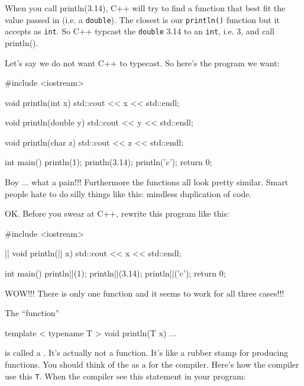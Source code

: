 When you call println(3.14), C++ will try to find a function that best
fit the value passed in (i.e. a \texttt{double}). The closest is our
\texttt{println()} function but it accepts as \texttt{int}. So C++ typcast
the \texttt{double} 3.14 to an \texttt{int}, i.e. 3, and call println().

Let's say we do not want C++ to typecast. So
here's the program we want:

\begin{consolethree}[escapeinside=||]
#include <iostream>

void println(int x)
{
    std::cout << x << std::endl;
}

void println(double y)
{
    std::cout << y << std::endl;
}

void println(char z)
{
    std::cout << z << std::endl;
}

int main()
{
    println(1);
    println(3.14);
    println('c');
    return 0;
}
\end{consolethree}

Boy ... what a pain!!! Furthermore the functions all look pretty
similar. Smart people hate to do silly things like this: mindless
duplication of code.

OK. Before you swear at C++, rewrite this program like this:

\begin{consolethree}[escapeinside=||]
#include <iostream>

||
void println(|| x)
{
    std::cout << x << std::endl;
}

int main()
{
    println||(1);
    println||(3.14);
    println||('c');
    return 0;
}
\end{consolethree}

WOW!!! There is only one function and it seems to work for all three
cases!!!

The ``function''

\begin{consolethree}[escapeinside=||]
template < typename T >
void println(T x)
{
    ...
}
\end{consolethree}

is called a . It's actually
not a function. It's like a rubber stamp for producing
functions. You should think of the  as a  for the compiler. Here's how the compiler use
this \texttt{T}. When the compiler see this statement in your program:


